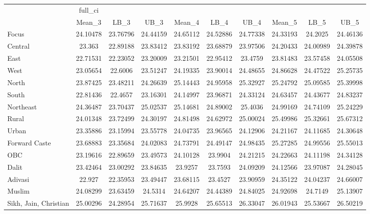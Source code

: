 \begin{tabular}{l*{9}{c}}
\hline\hline
                    &     full\_ci&            &            &            &            &            &            &            &            \\
                    &      Mean\_3&        LB\_3&        UB\_3&      Mean\_4&        LB\_4&        UB\_4&      Mean\_5&        LB\_5&        UB\_5\\
\hline
Focus               &    24.10478&    23.76796&    24.44159&    24.65112&    24.52886&    24.77338&    24.33193&     24.2025&    24.46136\\
Central             &      23.363&    22.89188&    23.83412&    23.83192&    23.68879&    23.97506&    24.20433&    24.00989&    24.39878\\
East                &    22.71531&    22.23052&    23.20009&    23.21501&    22.95412&     23.4759&    23.81483&    23.57458&    24.05508\\
West                &    23.05654&     22.6006&    23.51247&    24.19335&    23.90014&    24.48655&    24.86628&    24.47522&    25.25735\\
North               &    23.87425&    23.48211&    24.26639&    25.14443&    24.95958&    25.32927&    25.24792&    25.09585&    25.39998\\
South               &    22.81436&     22.4657&    23.16301&    24.14997&    23.96871&    24.33124&    24.63457&    24.43677&    24.83237\\
Northeast           &    24.36487&    23.70437&    25.02537&    25.14681&    24.89002&     25.4036&    24.99169&    24.74109&    25.24229\\
Rural               &    24.01348&    23.72499&    24.30197&    24.81498&    24.62972&    25.00024&    25.49986&    25.32661&    25.67312\\
Urban               &    23.35886&    23.15994&    23.55778&    24.04735&    23.96565&    24.12906&    24.21167&    24.11685&    24.30648\\
Forward Caste       &    23.68883&    23.35684&    24.02083&    24.73791&    24.49147&    24.98435&    25.27285&    24.99556&    25.55013\\
OBC                 &    23.19616&    22.89659&    23.49573&    24.10128&     23.9904&    24.21215&    24.22663&    24.11198&    24.34128\\
Dalit               &    23.42464&    23.00292&    23.84635&     23.9257&     23.7593&    24.09209&    24.12566&    23.97087&    24.28045\\
Adivasi             &      22.927&    22.35953&    23.49447&    23.68115&     23.4527&    23.90959&    24.35122&    24.04237&    24.66007\\
Muslim              &    24.08299&    23.63459&     24.5314&    24.64207&    24.44389&    24.84025&    24.92698&     24.7149&    25.13907\\
Sikh, Jain, Christian&    25.00296&    24.28954&    25.71637&     25.9928&    25.65513&    26.33047&    26.01943&    25.53667&    26.50219\\
\hline\hline
\end{tabular}

